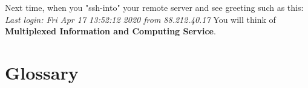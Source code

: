 Next time, when you "ssh-into" your remote server and see greeting such as this: \newline
\textit{Last login: Fri Apr 17 13:52:12 2020 from 88.212.40.17} \newline
You will think of \textbf{Multiplexed Information and Computing Service}.


\section{Glossary}

